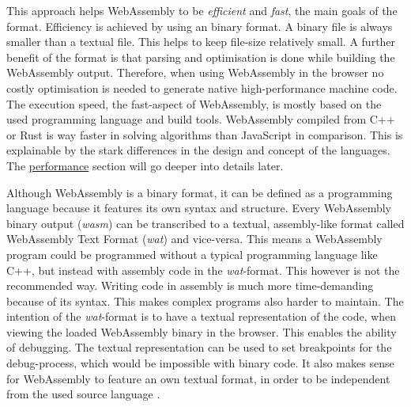 This approach helps WebAssembly to be \textit{efficient} and \textit{fast}, the main goals of the format. Efficiency is achieved by using an binary format. A binary file is always smaller than a textual file. This helps to keep file-size relatively small. A further benefit of the format is that parsing and optimisation is done while building the WebAssembly output. Therefore, when using WebAssembly in the browser no costly optimisation is needed to generate native high-performance machine code. The execution speed, the fast-aspect of WebAssembly, is mostly based on the used programming language and build tools. WebAssembly compiled from C++ or Rust is way faster in solving algorithms than JavaScript in comparison. This is explainable by the stark differences in the design and concept of the languages. The \hyperref[sec:performance]{performance} section will go deeper into details later.

\newpage

Although WebAssembly is a binary format, it can be defined as a programming language because it features its own syntax and structure. Every WebAssembly binary output (\textit{wasm}) can be transcribed to a textual, assembly-like format called WebAssembly Text Format (\textit{wat}) and vice-versa. This means a WebAssembly program could be programmed without a typical programming language like C++, but instead with assembly code in the \textit{wat}-format. This however is not the recommended way. Writing code in assembly is much more time-demanding because of its syntax. This makes complex programs also harder to maintain. The intention of the \textit{wat}-format is to have a textual representation of the code, when viewing the loaded WebAssembly binary in the browser. This enables the ability of debugging. The textual representation can be used to set breakpoints for the debug-process, which would be impossible with binary code. It also makes sense for WebAssembly to feature an own textual format, in order to be independent from the used source language \cite{wasm:bringthewebtospeed}.

